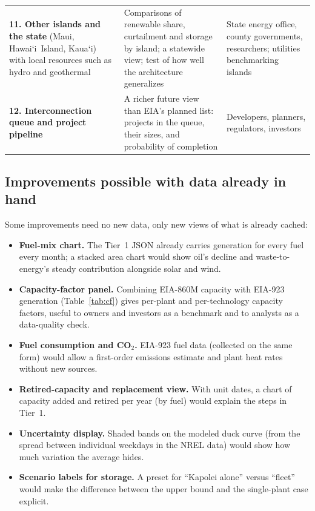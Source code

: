 \documentclass[11pt,a4paper]{article}
\newcommand{\okina}{\textquoteleft}
\newcommand{\Hawaii}{\texorpdfstring{Hawai\okina i}{Hawaii}}
\begin{document}
{\begin{longtable}{@{}>{\raggedright\arraybackslash}p{3.4cm}>{\raggedright\arraybackslash}p{5.9cm}>{\raggedright\arraybackslash}p{6.0cm}@{}}
\addlinespace
\textbf{11. Other islands and the state} (Maui, \Hawaii\ Island, Kaua\okina i) with local resources such as hydro and geothermal &
 Comparisons of renewable share, curtailment and storage by island; a statewide view; test of how well the architecture generalizes &
 State energy office, county governments, researchers; utilities benchmarking islands \\
\addlinespace
\textbf{12. Interconnection queue and project pipeline} &
 A richer future view than EIA's planned list: projects in the queue, their sizes, and probability of completion &
 Developers, planners, regulators, investors \\
\end{longtable}}

\subsection{Improvements possible with data already in hand}
Some improvements need no new data, only new views of what is already cached:
\begin{itemize}
\item \textbf{Fuel-mix chart.} The Tier~1 JSON already carries generation for every fuel every month; a stacked
 area chart would show oil's decline and waste-to-energy's steady contribution alongside solar and wind.
\item \textbf{Capacity-factor panel.} Combining EIA-860M capacity with EIA-923 generation (Table~\ref{tab:cf}) gives
 per-plant and per-technology capacity factors, useful to owners and investors as a benchmark and to analysts as a
 data-quality check.
\item \textbf{Fuel consumption and CO$_2$.} EIA-923 fuel data (collected on the same form) would allow a
 first-order emissions estimate and plant heat rates without new sources.
\item \textbf{Retired-capacity and replacement view.} With unit dates, a chart of capacity added and retired per
 year (by fuel) would explain the steps in Tier~1.
\item \textbf{Uncertainty display.} Shaded bands on the modeled duck curve (from the spread between individual weekdays
 in the NREL data) would show how much variation the average hides.
\item \textbf{Scenario labels for storage.} A preset for ``Kapolei alone'' versus ``fleet'' would make the difference
 between the upper bound and the single-plant case explicit.
\end{itemize}
\end{document}
